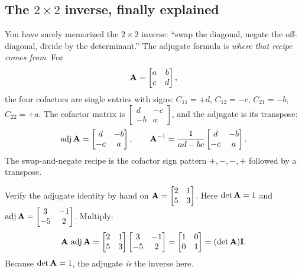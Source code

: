 \subsection{The \texorpdfstring{$2\times2$}{2x2} inverse, finally explained}

You have surely memorized the $2\times2$ inverse: ``swap the diagonal, negate the off-diagonal, divide
by the determinant.'' The adjugate formula is \emph{where that recipe comes from}. For
\[
\mathbf{A}=\begin{bmatrix} a & b \\ c & d \end{bmatrix},
\]
the four cofactors are single entries with signs: $C_{11}=+d$, $C_{12}=-c$, $C_{21}=-b$, $C_{22}=+a$.
The cofactor matrix is $\begin{bmatrix} d & -c \\ -b & a\end{bmatrix}$, and the adjugate is its
transpose:
\[
\operatorname{adj}\mathbf{A}=\begin{bmatrix} d & -b \\ -c & a\end{bmatrix},
\qquad
\mathbf{A}^{-1}=\frac{1}{ad-bc}\begin{bmatrix} d & -b \\ -c & a\end{bmatrix}.
\]
The swap-and-negate recipe is the cofactor sign pattern $+,-,-,+$ followed by a transpose.

\begin{labbox}
Verify the adjugate identity by hand on $\mathbf{A}=\begin{bmatrix}2&1\\5&3\end{bmatrix}$. Here
$\det\mathbf{A}=1$ and $\operatorname{adj}\mathbf{A}=\begin{bmatrix}3&-1\\-5&2\end{bmatrix}$. Multiply:
\[
\mathbf{A}\,\operatorname{adj}\mathbf{A}
=\begin{bmatrix}2&1\\5&3\end{bmatrix}\begin{bmatrix}3&-1\\-5&2\end{bmatrix}
=\begin{bmatrix}1&0\\0&1\end{bmatrix}=(\det\mathbf{A})\mathbf{I}.
\]
Because $\det\mathbf{A}=1$, the adjugate \emph{is} the inverse here.
\end{labbox}

